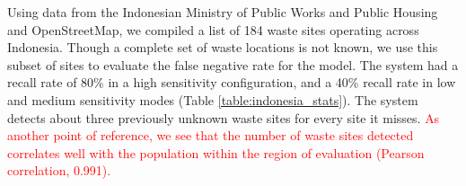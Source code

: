\documentclass[10pt,letterpaper]{article}
\begin{document}
Using data from the Indonesian Ministry of Public Works and Public Housing \cite{astinfra} and OpenStreetMap, we compiled a list of 184 waste sites operating across Indonesia. Though a complete set of waste locations is not known, we use this subset of sites to evaluate the false negative rate for the model. The system had a recall rate of 80\% in a high sensitivity configuration, and a 40\% recall rate in low and medium sensitivity modes (Table \ref{table:indonesia_stats}). The system detects about three previously unknown waste sites for every site it misses. \textcolor{red}{As another point of reference, we see that the number of waste sites detected correlates well with the population within the region of evaluation (Pearson correlation, 0.991).}

\newcommand{\specialcell}[2][b]{%
  \begin{tabular}[#1]{@{}c@{}}#2\end{tabular}}

\newcommand{\specialcellc}[2][c]{%
  \begin{tabular}[#1]{@{}c@{}}#2\end{tabular}}
\end{document}
